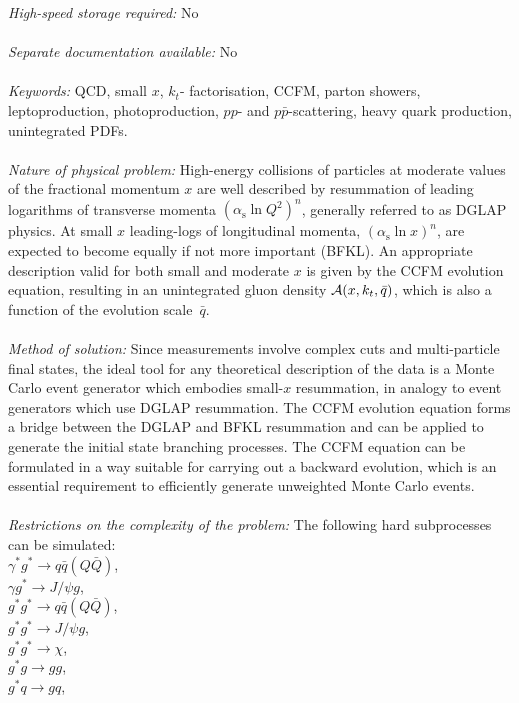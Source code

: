 \documentclass[11pt]{article} \usepackage{mystyle-new}
\newcommand{\as}{\alpha_\mathrm{s}}
\newcommand{\Pmax}{\bar{q}}
\newcommand{\kt}{k_{t}}
\begin{document}
{\em High-speed storage required:}  No \\ \\
{\em Separate documentation available: } No \\ \\
{\em Keywords: } QCD, small $x$, $k_t$- factorisation, CCFM, parton showers,
leptoproduction, photoproduction, $pp$- and $p\bar{p}$-scattering, 
heavy quark production, unintegrated PDFs.\\ \\
{\em Nature of physical problem:} 
High-energy collisions of particles at moderate values of the fractional momentum $x$ are well 
described by resummation of leading logarithms of transverse momenta 
$(\as \ln Q^2)^n$, generally referred to as DGLAP physics. At small $x$ 
leading-logs of longitudinal momenta, $(\as \ln x)^n$, are expected to become
equally if not more important (BFKL). An appropriate description valid for
both small and moderate $x$ is given by the CCFM evolution equation, resulting 
in an unintegrated gluon density  ${\cal A} (x,\kt,\Pmax ) $, which is also a 
function of the evolution scale~$\Pmax $. 
\\ \\
{\em Method of solution:}  
Since measurements involve complex cuts and multi-particle final states, the 
ideal tool for any theoretical description of the data is a Monte Carlo 
event generator which embodies small-$x$ resummation, in analogy to event 
generators which use DGLAP resummation. The CCFM evolution equation forms a bridge between the DGLAP and BFKL resummation and can be applied to generate the initial state branching processes. The CCFM equation  can be formulated in a way suitable for carrying out a 
backward evolution, which is an essential requirement to efficiently 
generate unweighted Monte Carlo events.
\\ \\
{\em Restrictions on the complexity of the problem:}  
The following hard subprocesses can be simulated:\\
$\gamma^* g^* \rightarrow q \bar{q} (Q\bar{Q})$, \\
$\gamma g^* \rightarrow J/\psi g $, \\
$ g^* g^* \rightarrow q \bar{q} (Q\bar{Q})$,\\
$ g^* g^* \to J/\psi g $, \\
$ g^* g^* \to \chi $,\\
$g^*g \to g g$, \\
$g^* q \to g q$, \\
\end{document}
